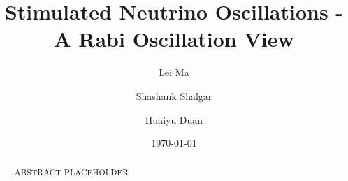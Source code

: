 \documentclass[%
preprint,
 amsmath,amssymb,
 aps,
]{revtex4-1}
\begin{document}

\title{Stimulated Neutrino Oscillations - A Rabi Oscillation View}%

\author{Lei Ma}
\author{Shashank Shalgar}%
\author{Huaiyu Duan}%
%








\date{\today}%

\begin{abstract}
ABSTRACT PLACEHOLDER
\end{abstract}
\end{document}
